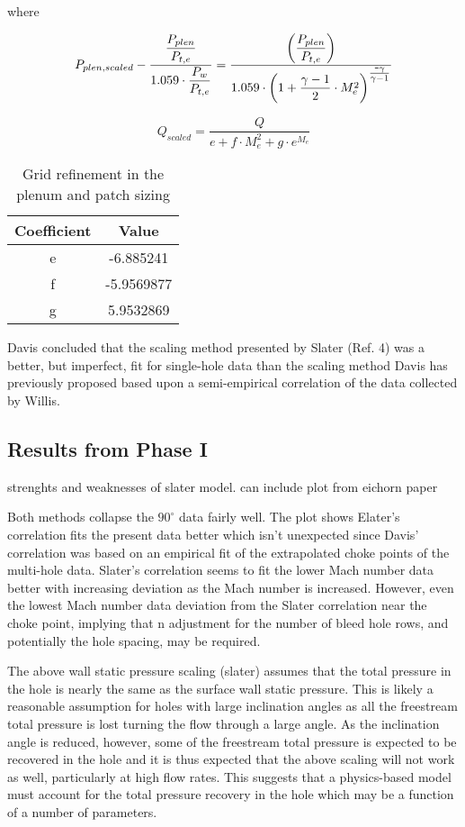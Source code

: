 \documentclass{article}
\begin{document}
where 

$$ P_{plen,scaled} - \frac{\dfrac{P_{plen}}{P_{t,e}}}{1.059\cdot\dfrac{P_w}{P_{t,e}}} = \dfrac{\qty(\dfrac{P_{plen}}{P_{t,e}})}{1.059 \cdot \qty(1+\dfrac{\gamma-1}{2}\cdot M^2_e)^{\textstyle\frac{\texttt{-}\gamma}{\gamma-1}}} $$

$$ Q_{scaled} = \dfrac{Q}{e + f\cdot M_e^2 + g \cdot e^{M_e}} $$

\begin{table}[!htbp] \centering 
\begin{tabular}[c]{*{2}{|c}|} \hline
\textbf{Coefficient} & \textbf{Value}   \\ \hline
e   & -6.885241  \\ \hline
f   & -5.9569877 \\ \hline
g   &  5.9532869 \\ \hline
\end{tabular} 
\caption{Grid refinement in the plenum and patch sizing} 
\label{tab:davis2} \end{table}

Davis \cite{Davis2012} concluded that the scaling method presented by Slater (Ref. 4) was a better, but imperfect, fit for single-hole data than the scaling method Davis has previously proposed based upon a semi-empirical correlation of the data collected by Willis.

\subsection{Results from Phase I}
strenghts and weaknesses of slater model. can include plot from eichorn paper

Both methods collapse the $90^\circ$ data fairly well. The plot shows Elater's correlation fits the present data better which isn't unexpected since Davis' correlation was based on an empirical fit of the extrapolated choke points of the multi-hole data. Slater's correlation seems to fit the lower Mach number data better with increasing deviation as the Mach number is increased. However, even the lowest Mach number data deviation from the Slater correlation near the choke point, implying that n adjustment for the number of bleed hole rows, and potentially the hole spacing, may be required.

The above wall static pressure scaling (slater) assumes that the total pressure in the hole is nearly the same as the surface wall static pressure. This is likely a reasonable assumption for holes with large inclination angles as all the freestream total pressure is lost turning the flow through a large angle. As the inclination angle is reduced, however, some of the freestream total pressure is expected to be recovered in the hole and it is thus expected that the above scaling will not work as well, particularly at high flow rates. This suggests that a physics-based model must account for the total pressure recovery in the hole which may be a function of a number of parameters.
\end{document}
